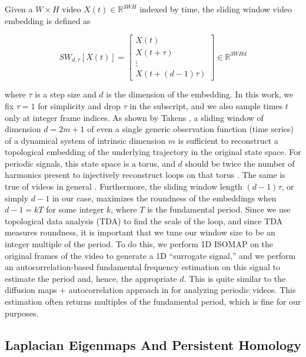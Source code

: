 \documentclass{article}
\begin{document}
Given a $W \times H$ video $X(t) \in \mathbb{R}^{3WH}$ indexed by time, the sliding window video embedding \cite{cao1998dynamics,traliehigh,tralie2017quasi} is defined as

\begin{equation}
SW_{d, \tau}[X(t)] = \left[ \begin{array}{c} X(t) \\ X(t + \tau) \\ \vdots \\ X(t + (d-1)\tau)  \end{array} \right] \in \mathbb{R}^{3WHd}
\end{equation}

where $\tau$ is a step size and $d$ is the dimension of the embedding.  In this work, we fix $\tau = 1$ for simplicity and drop $\tau$ in the subscript, and we also sample times $t$ only at integer frame indices.  As shown by Takens \cite{takens1981detecting}, a sliding window of dimension $d = 2m+1$ of even a single generic observation function (time series) of a dynamical system of intrinsic dimension $m$ is sufficient to reconstruct a topological embedding of the underlying trajectory in the original state space.  For periodic signals, this state space is a torus, and $d$ should be twice the number of harmonics present to injectively reconstruct loops on that torus \cite{perea2015sliding}.  The same is true of videos in general \cite{tralie2017quasi}.  Furthermore, the sliding window length $(d-1) \tau$, or simply $d-1$ in our case, maximizes the roundness of the embeddings when $d-1 = k T$ for some integer $k$, where $T$ is the fundamental period.  Since we use topological data analysis (TDA) to find the scale of the loop, and since TDA measures roundness, it is important that we tune our window size to be an integer multiple of the period.  To do this, we perform 1D ISOMAP \cite{tenenbaum2000global} on the original frames of the video to generate a 1D ``surrogate signal,'' and we perform an autocorrelation-based fundamental frequency estimation \cite{Mcleod05asmarter} on this signal to estimate the period and, hence, the appropriate $d$.  This is quite similar to the diffusion maps + autocorrelation approach in \cite{tralie2017quasi} for analyzing periodic videos.  This estimation often returns multiples of the fundamental period, which is fine for our purposes.

\subsection{Laplacian Eigenmaps And Persistent Homology}
\label{sec:laplacian}
\end{document}
